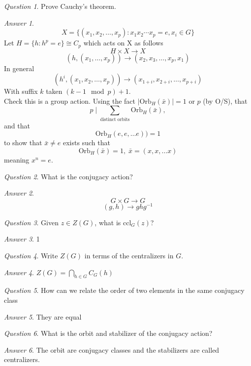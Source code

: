 \documentclass[]{article}
\theoremstyle{remark}
\theoremstyle{qnstyle}
\newtheorem{question}{Question}
\theoremstyle{answerstyle}
\newtheorem*{answer}{Answer}
\begin{document}
\begin{question}
    Prove Cauchy's theorem.
\end{question}
\begin{answer}
    $$X = \{ (x_1, x_2, \ldots, x_p): x_1 x_2 \cdots x_p = e, x_i \in G \}$$
    Let $H = \lbrace h: h^p = e \rbrace \cong C_p$
    which acts on X as follows
    $$H \times X \to X$$
    $$(h, (x_1,\ldots , x_p)) \to (x_2, x_3, \ldots, x_p, x_1)$$
    In general $$(h^i, (x_1,x_2, \ldots, x_p)) \to (x_{1+i}, x_{2+i}, \ldots, x_{p+i})$$
    With suffix $k$ taken $(k-1 \mod p) +1$. \\
    Check this is a group action. Using the fact $|\text{Orb}_H(\bar{x})| = 1$ or $p$ (by O/S),
    that $$p \; \Big\vert\; \sum_{\text{distinct orbits}}{\text{Orb}_H}(\bar{x}),$$ and that 
    $$\text{Orb}_H(e,e, \ldots e)) = 1$$ to show that 
    $\bar{x} \neq e$ exists such that $$\text{Orb}_H(\bar{x}) = 1, \; \bar{x} = (x, x, \ldots x)$$
    meaning $x^n = e$.
\end{answer}  

\begin{question}
    What is the conjugacy action?
\end{question}
\begin{answer}
    $$G \times G \to G$$
    $$(g, h) \to ghg^{-1}$$
\end{answer}

\begin{question}
    Given $z \in Z(G)$, what is $\text{ccl}_G(z)$?
\end{question}
\begin{answer}
    1
\end{answer}

\begin{question}
    Write $Z(G)$ in terms of the centralizers in $G$.
\end{question}
\begin{answer}
    $Z(G) = \bigcap_{h \in G} C_G(h)$
\end{answer}

\begin{question}
    How can we relate the order of two elements in the same conjugacy class
\end{question}
\begin{answer}
    They are equal
\end{answer}

\begin{question}
    What is the orbit and stabilizer of the conjugacy action?
\end{question}
\begin{answer}
    The orbit are conjugacy classes and the stabilizers are called centralizers.
\end{answer}
\end{document}
